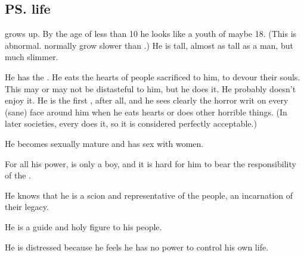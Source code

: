 \subsection{\ps{\Thanatzil}{} life}
\Thanatzil{} grows up. By the age of less than 10 he looks like a \human{} youth of maybe 18. 
(This is abnormal. \Resphain{} normally grow slower than \humans.) 
He is tall, almost as tall as a \nephilic{} man, but much slimmer. 

He has the . 
He eats the hearts of people sacrificed to him, to devour their souls. 
This may or may not be distasteful to him, but he does it. 
He probably doesn't enjoy it. He is the first \resphan, after all, and he sees clearly the horror writ on every (sane) face around him when he eats hearts or does other horrible things. 
(In later \resphan{} societies, every \resphan{} does it, so it is considered perfectly acceptable.)

He becomes sexually mature and has sex with \nephil{} women. 

For all his power, \Thanatzil{} is only a boy, and it is hard for him to bear the responsibility of the \banemessiah. 

He knows that he is a scion and representative of the \bane{} people, an incarnation of their legacy.


He is a guide and holy figure to his people. 


He is distressed because he feels he has no power to control his own life. 


